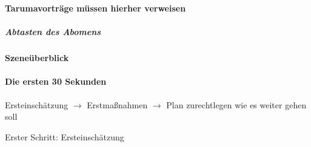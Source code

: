 \documentclass{article}
\begin{document}
{\bfseries\color[rgb]{0.5019608,0.0,0.0}
Tarumavortr\"age m\"ussen hierher verweisen}

\subparagraph{Abtasten des Abomens }
\clearpage{}

\paragraph{Szene\"uberblick}
\paragraph[Die ersten \ \ 30 Sekunden ]{Die ersten  30 Sekunden }
{\mdseries
Ersteinsch\"atzung ${\rightarrow}$  Erstma{\ss}nahmen ${\rightarrow}$ 
Plan zurechtlegen wie es weiter gehen soll}

{\mdseries\color{black}
Erster Schritt: Ersteinsch\"atzung}
\end{document}
